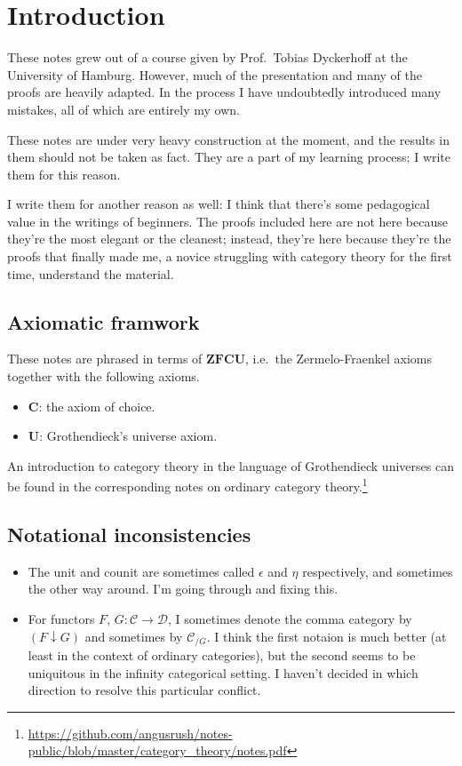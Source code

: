 \documentclass[main.tex]{subfiles}
\begin{document}
\chapter{Introduction}
\label{ch:introduction}

These notes grew out of a course given by Prof.\ Tobias Dyckerhoff at the University of Hamburg. However, much of the presentation and many of the proofs are heavily adapted. In the process I have undoubtedly introduced many mistakes, all of which are entirely my own.

These notes are under very heavy construction at the moment, and the results in them should not be taken as fact. They are a part of my learning process; I write them for this reason.

I write them for another reason as well: I think that there's some pedagogical value in the writings of beginners. The proofs included here are not here because they're the most elegant or the cleanest; instead, they're here because they're the proofs that finally made me, a novice struggling with category theory for the first time, understand the material.

\section{Axiomatic framwork}
\label{sec:axiomatic_framwork}

These notes are phrased in terms of $\mathbf{ZFCU}$, i.e.\ the Zermelo-Fraenkel axioms together with the following axioms.
\begin{itemize}
  \item $\mathbf{C}$: the axiom of choice.

  \item $\mathbf{U}$: Grothendieck's universe axiom.
\end{itemize}

An introduction to category theory in the language of Grothendieck universes can be found in the corresponding notes on ordinary category theory.\footnote{\url{https://github.com/angusrush/notes-public/blob/master/category_theory/notes.pdf}}

\section{Notational inconsistencies}
\label{sec:notation}

\begin{itemize}
  \item The unit and counit are sometimes called $\epsilon$ and $\eta$ respectively, and sometimes the other way around. I'm going through and fixing this.

  \item For functors $F$, $G\colon \mathcal{C} \to \mathcal{D}$, I sometimes denote the comma category by $(F \downarrow G)$ and sometimes by $\mathcal{C}_{/G}$. I think the first notaion is much better (at least in the context of ordinary categories), but the second seems to be uniquitous in the infinity categorical setting. I haven't decided in which direction to resolve this particular conflict.
\end{itemize}
\end{document}
